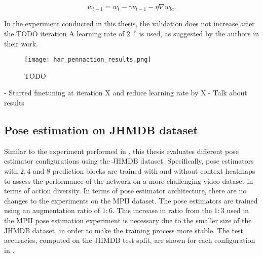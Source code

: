 \begin{equation}
    w_{t+1} = w_t - \gamma \nu_{t-1} - \eta \nabla w_{la}.
\end{equation}

In the experiment conducted in this thesis, the validation does not increase after the TODO iteration
A learning rate of $2^{-5}$ is used, as suggested by the authors in their work.

\begin{figure}[htb!]
    \centering
    \texttt{[image: har\_pennaction\_results.png]}
    \caption{TODO}
    \label{fig:har_pennaction_results}
\end{figure}

- Started finetuning at iteration X and reduce learning rate by X %
- Talk about results

\subsection{Pose estimation on JHMDB dataset}
\label{sec:exp-pose-jhmdb}
Similar to the experiment performed in , this thesis evaluates different pose estimator configurations using the JHMDB dataset.
Specifically, pose estimators with $2, 4$ and $8$ prediction blocks are trained with and without context heatmaps to assess the performance of the network on a more challenging video dataset in terms of action diversity.
In terms of pose estimator architecture, there are no changes to the experiments on the MPII dataset.
The pose estimators are trained using an augmentation ratio of $1:6$.
This increase in ratio from the $1:3$ used in the MPII pose estimation experiment is necessary due to the smaller size of the JHMDB dataset, in order to make the training process more stable.
The test accuracies, computed on the JHMDB test split, are shown for each configuration in .


